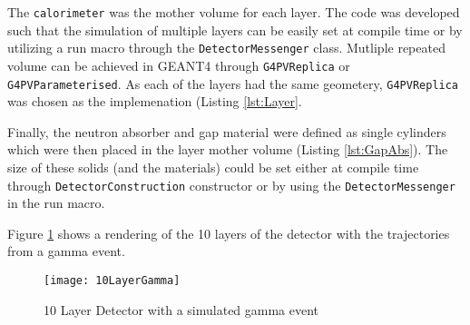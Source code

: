 The \verb+calorimeter+ was the mother volume for each layer. 
The code was developed such that the simulation of multiple layers can be easily set at compile time or by utilizing a run macro through the \verb+DetectorMessenger+ class.
Mutliple repeated volume can be achieved in GEANT4 through \verb+G4PVReplica+ or \verb+G4PVParameterised+.
As each of the layers had the same geometery, \verb+G4PVReplica+ was chosen as the implemenation (Listing \ref{lst:Layer}.

Finally, the neutron absorber and gap material were defined as single cylinders which were then placed in the layer mother volume (Listing \ref{lst:GapAbs}).
The size of these solids (and the materials) could be set either at compile time through \verb+DetectorConstruction+ constructor or by using the \verb+DetectorMessenger+ in the run macro.

Figure \ref{fig:LayerDetectorGeo} shows a rendering of the 10 layers of the detector with the trajectories from a gamma event.
\begin{figure} 
    \texttt{[image: 10LayerGamma]}
	\caption{10 Layer Detector with a simulated gamma event}
    \label{fig:LayerDetectorGeo}
\end{figure}

